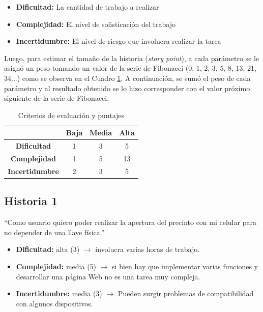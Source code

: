 \documentclass[
11pt, %
]{charter}
\begin{document}
\begin{itemize}
	\item \textbf{Dificultad:} La cantidad de trabajo a realizar
	\item \textbf{Complejidad:} El nivel de sofisticación del trabajo
	\item \textbf{Incertidumbre:} El nivel de riesgo que involucra realizar la tarea
\end{itemize}

Luego, para estimar el tamaño de la historia (\textit{story point}), a cada parámetro se le asignó un peso tomando un valor de la serie de Fibonacci (0, 1, 2, 3, 5, 8, 13, 21, 34...) como se observa en el Cuadro \ref{tab:criterios_evaluacion}. A continuación, se sumó el peso de cada parámetro y al resultado obtenido se lo hizo corresponder con el valor próximo siguiente de la serie de Fibonacci.

\begin{table}[ht]
\centering
\begin{tabular}{|c|c|c|c|}
\hline
           				& \textbf{Baja} & \textbf{Media}& \textbf{Alta}\\ \hline
\textbf{Dificultad} 	&	1   		&	3			&   5	\\ \hline
\textbf{Complejidad}	&	1			&	5			&	13 	\\ \hline
\textbf{Incertidumbre}	&   2   		&   3     		&  	5	\\ \hline
\end{tabular}
\caption{Criterios de evaluación y puntajes}
\label{tab:criterios_evaluacion}
\end{table}

\subsection{Historia 1}
``Como usuario quiero poder realizar la apertura del precinto con mi celular para no depender de una llave física.''

\begin{itemize}
	\item \textbf{Dificultad:} alta (3) $\rightarrow$ involucra varias horas de trabajo.
	\item \textbf{Complejidad:} media (5) $\rightarrow$ si bien hay que implementar varias funciones y desarrollar una página Web no es una tarea muy compleja.
	\item \textbf{Incertidumbre:} media (3) $\rightarrow$ Pueden surgir problemas de compatibilidad con algunos dispositivos.
\end{itemize}
\end{document}
